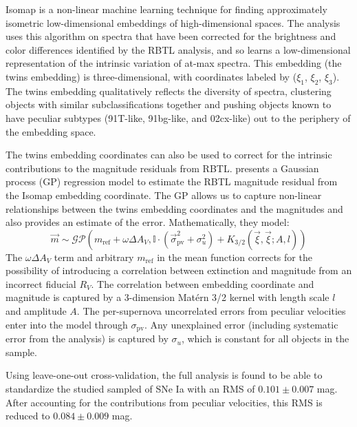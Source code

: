 Isomap is a non-linear machine learning technique for finding approximately isometric low-dimensional embeddings of high-dimensional spaces. The  analysis uses this algorithm on spectra that have been corrected for the brightness and color differences identified by the RBTL analysis, and so learns a low-dimensional representation of the intrinsic variation of at-max spectra. This embedding (the twins embedding) is three-dimensional, with coordinates labeled by ($\xi_1$, $\xi_2$, $\xi_3$). The twins embedding qualitatively reflects the diversity of \sn spectra, clustering objects with similar subclassifications together and pushing objects known to have peculiar subtypes (91T-like, 91bg-like, and 02cx-like) out to the periphery of the embedding space. 

The twins embedding coordinates can also be used to correct for the intrinsic contributions to the magnitude residuals from RBTL.  presents a Gaussian process (GP) regression model to estimate the RBTL magnitude residual from the Isomap embedding coordinate. The GP allows us to capture non-linear relationships between the twins embedding coordinates and the magnitudes and also provides an estimate of the error. Mathematically, they model:
\begin{equation}
    \vec{m} \sim \mathcal{GP}\left(m_{\text{ref}} + \omega\Delta A_V, \mathbb{I}\cdot(\vec{\sigma}_{\text{pv}}^2 + \sigma_u^2) + K_{3/2}(\vec{\xi}, \vec{\xi}; A, l)\right)
    \label{eqn:gp}
\end{equation}
The $\omega\Delta A_V$ term and arbitrary $m_{\text{ref}}$ in the mean function corrects for the possibility of introducing a correlation between extinction and magnitude from an incorrect fiducial $R_V$. The correlation between embedding coordinate and magnitude is captured by a 3-dimension Mat\'{e}rn 3/2 kernel with length scale $l$ and amplitude $A$. The per-supernova uncorrelated errors from peculiar velocities enter into the model through $\sigma_{\text{pv}}$. Any unexplained error (including systematic error from the analysis) is captured by $\sigma_u$, which is constant for all objects in the sample.

Using leave-one-out cross-validation, the full analysis is found to be able to standardize the studied sampled of SNe Ia with an RMS of $0.101 \pm 0.007$ mag. After accounting for the contributions from peculiar velocities, this RMS is reduced to $0.084 \pm 0.009$ mag.


